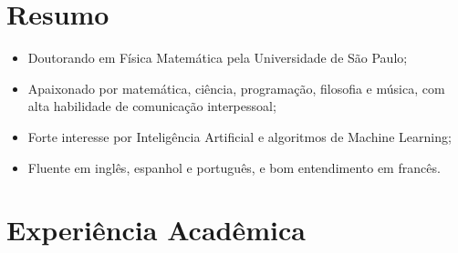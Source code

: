 \documentclass[11pt,a4paper,sans]{moderncv}        %
\begin{document}
\makecvtitle

\section{Resumo}

\begin{itemize} 
\item Doutorando em Física Matemática pela Universidade de São Paulo; 
\item Apaixonado por matemática, ciência, programação, filosofia e música, com alta habilidade de comunicação interpessoal;
\item Forte interesse por Inteligência Artificial e algoritmos de Machine Learning;
\item Fluente em inglês, espanhol e português, e bom entendimento em francês.
\end{itemize} 

\section{Experiência Acadêmica}

\vspace{3pt}
\end{document}
